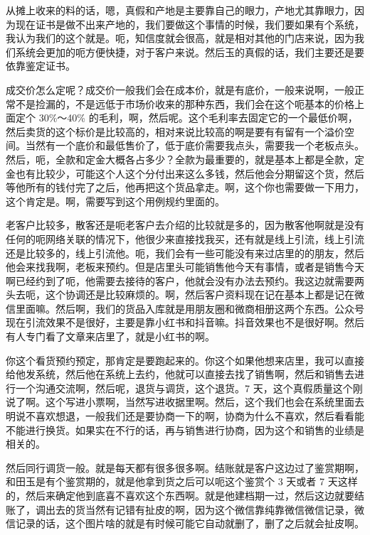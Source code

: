 \documentclass[12pt, a4paper]{ctexart}
\begin{document}
\medskip
\noindent
从摊上收来的料的话，嗯，真假和产地是主要靠自己的眼力，产地尤其靠眼力，因为现在证书是做不出来产地的，我们要做这个事情的时候，我们要如果有个系统，我认为我们的这个就是。呃，知信度就会很高，就是相对其他的门店来说，因为我们系统会更加的呃方便快捷，对于客户来说。然后玉的真假的话，我们主要还是要依靠鉴定证书。

\medskip
\noindent
成交价怎么定呢？成交价一般我们会在成本价，就是有底价，一般来说啊，一般正常不是捡漏的，不是远低于市场价收来的那种东西，我们会在这个呃基本的价格上面定个 30\%～40\% 的毛利，啊，然后呢。这个毛利率去固定它的一个最低价啊，然后卖货的这个标价是比较高的，相对来说比较高的啊是要有有留有一个溢价空间。当然有一个底价和最低售价了，低于底价需要我点头，需要我一个老板点头。然后，呃，全款和定金大概各占多少？全款为最重要的，就是基本上都是全款，定金也有比较少，可能这个人这个分付出来这么多钱，然后他会分期留这个货，然后等他所有的钱付完了之后，他再把这个货品拿走。啊，这个你也需要做一下用力，这个肯定是。啊，需要写到这个用例规约里面的。

\medskip
\noindent
老客户比较多，散客还是呃老客户去介绍的比较就是多的，因为散客他啊就是没有任何的呃网络关联的情况下，他很少来直接找我买，还有就是线上引流，线上引流还是比较多的，线上引流他。呃，我们会有一些可能没有来过店里的的朋友，然后他会来找我啊，老板来预约。但是店里头可能销售他今天有事情，或者是销售今天啊已经约到了呃，他需要去接待的客户，他就会没有办法去预约。我这边就需要两头去呃，这个协调还是比较麻烦的。啊，然后客户资料现在记在基本上都是记在微信里面嘛。然后啊，我们的货品入库就是用朋友圈和微商相册这两个东西。公众号现在引流效果不是很好，主要是靠小红书和抖音嘛。抖音效果也不是很好啊。然后有人专门看了文章来店里了，就是小红书的啊。

\medskip
\noindent
你这个看货预约预定，那肯定是要跑起来的。你这个如果他想来店里，我可以直接给他发系统，然后他在系统上去约，他就可以直接去找了销售啊，然后和销售去进行一个沟通交流啊，然后呢，退货与调货，这个退货。7 天，这个真假质量这个刚说了啊。这个写进小票啊，当然写进收据里啊。然后，这个我们也会在系统里面去明说不喜欢想退，一般我们还是要协商一下的啊，协商为什么不喜欢，然后看看能不能进行换货。如果实在不行的话，再与销售进行协商，因为这个和销售的业绩是相关的。

\medskip
\noindent
然后同行调货一般。就是每天都有很多很多啊。结账就是客户这边过了鉴赏期啊，和田玉是有个鉴赏期的，就是他拿到货之后可以呃这个鉴赏个 3 天或者 7 天这样的，然后来确定他到底喜不喜欢这个东西啊。就是他建档期一过，然后这边就要结账了，调出去的货当然有记错有扯皮的啊，因为这个微信靠纯靠微信微信记录，微信记录的话，这个图片啥的就是有时候可能它自动就删了，删了之后就会扯皮啊。
\end{document}

